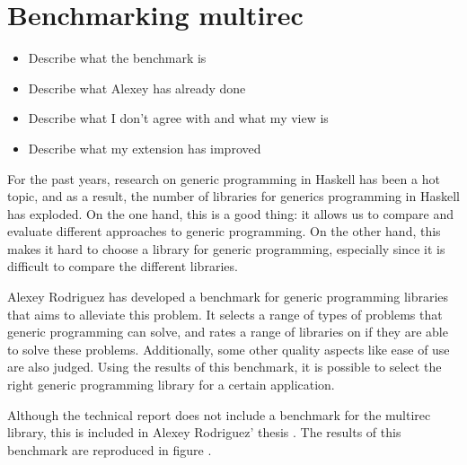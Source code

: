\chapter{Benchmarking multirec}
\cite{benchmark}

\begin{itemize}
\item Describe what the benchmark is
\item Describe what Alexey has already done
\item Describe what I don't agree with and what my view is
\item Describe what my extension has improved
\end{itemize}

For the past years, research on generic programming in Haskell has
been a hot topic, and as a result, the number of libraries for
generics programming in Haskell has exploded. On the one hand, this
is a good thing: it allows us to compare and evaluate different
approaches to generic programming. On the other hand, this makes it
hard to choose a library for generic programming, especially since it
is difficult to compare the different libraries.

Alexey Rodriguez has developed a benchmark for generic programming
libraries \cite{benchmark} that aims to alleviate this problem. It
selects a range of types of problems that generic programming can
solve, and rates a range of libraries on if they are able to solve
these problems. Additionally, some other quality aspects like ease of
use are also judged. Using the results of this benchmark, it is
possible to select the right generic programming library for a certain
application.

Although the technical report does not include a benchmark for the
multirec \cite{multirec} library, this is included in Alexey
Rodriguez' thesis \cite{thesis_alexey}. The results of this benchmark
are reproduced in figure .
